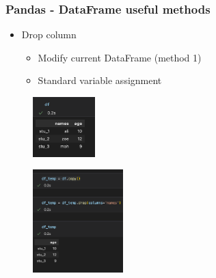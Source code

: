 \begin{frame}\frametitle{Pandas - DataFrame useful methods}
   \begin{minipage}{0.58\linewidth}
      \begin{itemize}
         \item Drop column
         \begin{itemize}
            \item Modify current DataFrame (method 1)
            \item Standard variable assignment
         \end{itemize}
      \end{itemize}
      \vspace{.5cm}
      \begin{figure}[H]
         \includegraphics[width=2.4cm]{../images/illustrations/pandas_df_ex.png}
      \end{figure}
   \end{minipage}
   \begin{minipage}{0.38\linewidth}
      \begin{figure}[H]
         \includegraphics[width=3.5cm]{../images/illustrations/pandas_drop_assigned.png}
      \end{figure}
   \end{minipage}
\end{frame}

